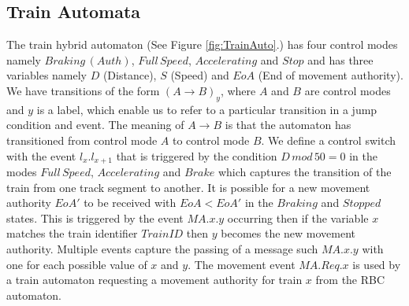 \subsection*{Train Automata}
The train hybrid automaton (See Figure \ref{fig:TrainAuto}.) has four control modes namely $Braking \, (Auth)$, $Full \, Speed$, $Accelerating$ and $Stop$ and has three variables namely $D$ (Distance),  $S$ (Speed) and $EoA$ (End of movement authority). We have transitions of the form $(A \to B)_y$, where $A$ and $B$ are control modes and $y$ is a label, which enable us to refer to a particular transition in a jump condition and event. The meaning  of $A \to B$ is that the automaton has transitioned from control mode $A$ to control mode $B$. We define a control switch with the event $l_x.l_{x+1}$ that is triggered by the condition $D \, mod \, 50 = 0$ in the modes $Full \, Speed$, $Accelerating$ and $Brake$ which captures the transition of the train from one track segment to another. It is possible for a new movement authority $EoA'$ to be received with $EoA < EoA'$  in the $Braking$ and $Stopped$ states.  This is triggered by the event $MA.x.y$ occurring then if the variable $x$ matches the train identifier $TrainID$ then $y$ becomes the new movement authority. Multiple events capture the passing of a message such $MA.x.y$ with one for each possible value of $x$ and $y$. The movement event $MA.Req.x$ is used by a train automaton requesting a movement authority for train $x$ from the RBC automaton.
\medskip
